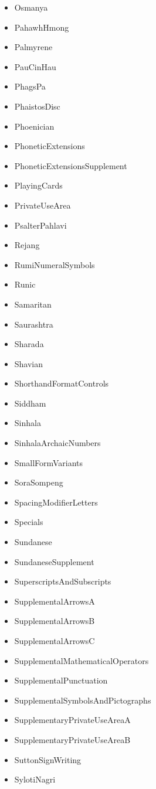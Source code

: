 ﻿\documentclass{article}
\newenvironment{itemlist}{%
  \begin{itemize}
	\setlength{\itemsep}{0pt}
	\setlength{\parsep}{0pt}
	\setlength{\topsep}{0pt}
	\setlength{\partopsep}{0pt}
	\setlength{\parskip}{0pt}
	\setlength{\labelsep}{5pt}}%
{
  \end{itemize}}
\begin{document}
\begin{multicols}{2}
\begin{itemlist}
				\item Osmanya
				\item PahawhHmong
				\item Palmyrene
				\item PauCinHau
				\item PhagsPa
				\item PhaistosDisc
				\item Phoenician
				\item PhoneticExtensions
				\item PhoneticExtensionsSupplement
				\item PlayingCards
				\item PrivateUseArea
				\item PsalterPahlavi
				\item Rejang
				\item RumiNumeralSymbols
				\item Runic
				\item Samaritan
				\item Saurashtra
				\item Sharada
				\item Shavian
				\item ShorthandFormatControls
				\item Siddham
				\item Sinhala
				\item SinhalaArchaicNumbers
				\item SmallFormVariants
				\item SoraSompeng
				\item SpacingModifierLetters
				\item Specials
				\item Sundanese
				\item SundaneseSupplement
				\item SuperscriptsAndSubscripts
				\item SupplementalArrowsA
				\item SupplementalArrowsB
				\item SupplementalArrowsC
				\item SupplementalMathematicalOperators
				\item SupplementalPunctuation
				\item SupplementalSymbolsAndPictographs
				\item SupplementaryPrivateUseAreaA
				\item SupplementaryPrivateUseAreaB
				\item SuttonSignWriting
				\item SylotiNagri

\end{itemlist}
\end{multicols}
\end{document}
